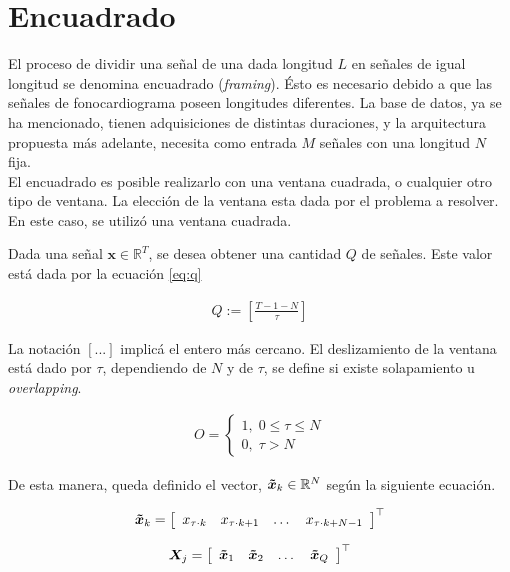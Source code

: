 \newpage

\section{Encuadrado} \label{sec:framing}

\indent El proceso de dividir una señal de una dada longitud $L$ en señales de igual longitud se denomina encuadrado
(\textit{framing}). Ésto es necesario debido a que las señales de fonocardiograma poseen longitudes diferentes. La
base de datos, ya se ha mencionado, tienen adquisiciones de distintas duraciones, y la arquitectura propuesta más
adelante, necesita como entrada $M$ señales con una longitud $N$ fija. \\
\indent El encuadrado es posible realizarlo con una ventana cuadrada, o cualquier otro tipo de ventana. La elección
de la ventana esta dada por el problema a resolver. En este caso, se utilizó una ventana cuadrada. \bigskip

\indent Dada una señal $\mathbf{x} \in \mathbb{R}^T$, se desea obtener una cantidad $Q$ de señales. Este valor está
dada por la ecuación \ref{eq:q}

\begin{align}
  \label{eq:q}
  Q := \left[\frac{T-1-N}{\tau}\right]
\end{align}

\indent La notación $[...]$ implicá el entero más cercano. El deslizamiento de la ventana está dado por $\tau$,
dependiendo de $N$ y de $\tau$, se define si existe solapamiento u \textit{overlapping}.

\begin{align}
  O =
  \begin{cases}
    1, \; 0 \leq \tau \leq N \\
    0, \; \tau > N
  \end{cases}
\end{align}

\indent De esta manera, queda definido el vector, $\bm{\Tilde{x}}_k \in \mathbb{R}^{N}$ según la siguiente ecuación.

\begin{align}
  \bm{\Tilde{x}}_k = \left[\begin{array}{cccc}
    x_{\tau \cdot k} &
    x_{\tau \cdot k+1} &
    \dots & x_{\tau \cdot k + N - 1}
  \end{array}\right]^\top
\end{align}

\begin{align}
  \bm{X}_j = \left[\begin{array}{cccc}
    \bm{\Tilde{x}}_1 &
    \bm{\Tilde{x}}_2 &
    \dots &
    \bm{\Tilde{x}}_Q
  \end{array}\right]^\top
\end{align}

